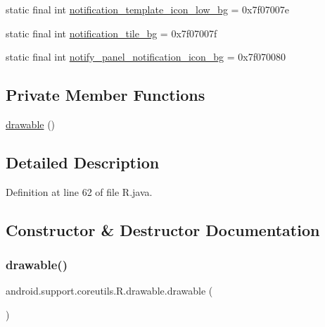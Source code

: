\begin{DoxyCompactItemize}
\item 
static final int \mbox{\hyperlink{classandroid_1_1support_1_1coreutils_1_1_r_1_1drawable_a403b56ac85ecd42e8800e902613bf438}{notification\+\_\+template\+\_\+icon\+\_\+low\+\_\+bg}} = 0x7f07007e
\item 
static final int \mbox{\hyperlink{classandroid_1_1support_1_1coreutils_1_1_r_1_1drawable_a6108983b4bcd3db6cd2fd8814a20d1b9}{notification\+\_\+tile\+\_\+bg}} = 0x7f07007f
\item 
static final int \mbox{\hyperlink{classandroid_1_1support_1_1coreutils_1_1_r_1_1drawable_a052e2e692f5581a2fcda2ae98607764b}{notify\+\_\+panel\+\_\+notification\+\_\+icon\+\_\+bg}} = 0x7f070080
\end{DoxyCompactItemize}
\subsection*{Private Member Functions}
\begin{DoxyCompactItemize}
\item 
\mbox{\hyperlink{classandroid_1_1support_1_1coreutils_1_1_r_1_1drawable_a6debf1c993319a575ec3ecf3f114afab}{drawable}} ()
\end{DoxyCompactItemize}


\subsection{Detailed Description}


Definition at line 62 of file R.\+java.



\subsection{Constructor \& Destructor Documentation}
\mbox{\label{classandroid_1_1support_1_1coreutils_1_1_r_1_1drawable_a6debf1c993319a575ec3ecf3f114afab}} 
\subsubsection{\texorpdfstring{drawable()}{drawable()}}
{\footnotesize\ttfamily android.\+support.\+coreutils.\+R.\+drawable.\+drawable (\begin{DoxyParamCaption}{ }\end{DoxyParamCaption})\hspace{0.3cm}{\ttfamily [private]}}



